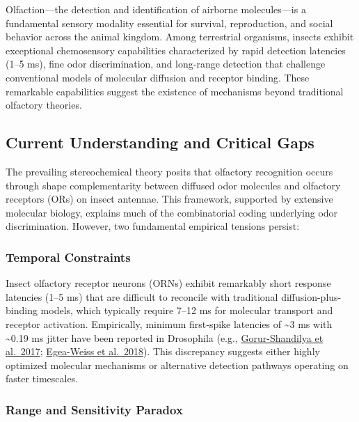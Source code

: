 \documentclass[
  13pt,
  a4paperpaper,
  12pt]{article}
\author{}
\date{}
\begin{document}
{
\hypersetup{linkcolor=black}
\setcounter{tocdepth}{3}
\tableofcontents
}
Olfaction---the detection and identification of airborne molecules---is
a fundamental sensory modality essential for survival, reproduction, and
social behavior across the animal kingdom. Among terrestrial organisms,
insects exhibit exceptional chemosensory capabilities characterized by
rapid detection latencies (1--5 ms), fine odor discrimination, and
long-range detection that challenge conventional models of molecular
diffusion and receptor binding. These remarkable capabilities suggest
the existence of mechanisms beyond traditional olfactory theories.

\subsection{Current Understanding and Critical
Gaps}\label{current-understanding-and-critical-gaps}

The prevailing stereochemical theory posits that olfactory recognition
occurs through shape complementarity between diffused odor molecules and
olfactory receptors (ORs) on insect antennae. This framework, supported
by extensive molecular biology, explains much of the combinatorial
coding underlying odor discrimination. However, two fundamental
empirical tensions persist:

\subsubsection{Temporal Constraints}\label{temporal-constraints}

Insect olfactory receptor neurons (ORNs) exhibit remarkably short
response latencies (1--5 ms) that are difficult to reconcile with
traditional diffusion-plus-binding models, which typically require 7--12
ms for molecular transport and receptor activation. Empirically, minimum
first‑spike latencies of \textasciitilde3 ms with \textasciitilde0.19 ms
jitter have been reported in Drosophila (e.g.,
\href{https://elifesciences.org/articles/27670}{Gorur-Shandilya et
al.~2017};
\href{https://pmc.ncbi.nlm.nih.gov/articles/PMC6147046/}{Egea-Weiss et
al.~2018}). This discrepancy suggests either highly optimized molecular
mechanisms or alternative detection pathways operating on faster
timescales.

\subsubsection{Range and Sensitivity
Paradox}\label{range-and-sensitivity-paradox}
\end{document}
